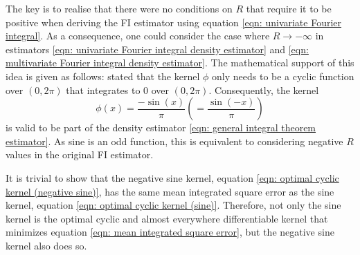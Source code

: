 \documentclass[%
 reprint,
 amsmath,amssymb,
 aps,
]{revtex4-2}
\begin{document}
The key is to realise that there were no conditions on $R$ that require it to be positive when deriving the FI estimator using equation \eqref{eqn: univariate Fourier integral}. As a consequence, one could consider the case where $R \to -\infty$ in estimators \eqref{eqn: univariate Fourier integral density estimator} and \eqref{eqn: multivariate Fourier integral density estimator}. The mathematical support of this idea is given as follows: \cite{ho2021integral} stated that the kernel $\phi$ only needs to be a cyclic function over $(0, 2\pi)$ that integrates to 0 over $(0, 2\pi)$. Consequently, the kernel 
\begin{equation} \label{eqn: optimal cyclic kernel (negative sine)}
    \phi(x) = \frac{-\sin(x)}{\pi} \left(= \frac{\sin(-x)}{\pi}\right)
\end{equation}
is valid to be part of the density estimator \eqref{eqn: general integral theorem estimator}. As sine is an odd function, this is equivalent to considering negative $R$ values in the original FI estimator.

It is trivial to show that the negative sine kernel, equation \eqref{eqn: optimal cyclic kernel (negative sine)}, has the same mean integrated square error as the sine kernel, equation \eqref{eqn: optimal cyclic kernel (sine)}. Therefore, not only the sine kernel is the optimal cyclic and almost everywhere differentiable kernel that minimizes equation \eqref{eqn: mean integrated square error}, but the negative sine kernel also does so.
\end{document}
